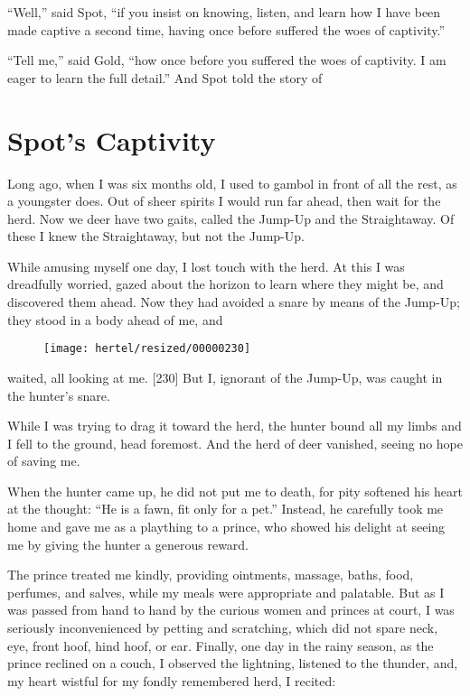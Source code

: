 \documentclass[article, twoside, 10pt]{memoir}
\begin{document}
``Well,'' said Spot,
``if you insist on knowing, listen, and learn how I have been made captive a second time, having once before suffered the woes of captivity.''

``Tell me,'' said Gold,
``how once before you suffered the woes of captivity. I am eager to learn the full detail.''
And Spot told the story of

\chapter{Spot's Captivity}

Long ago, when I was six months old, I used to gambol in front of
all the rest, as a youngster does. Out of sheer spirits I would run
far ahead, then wait for the herd. Now we deer have two gaits,
called the Jump-Up and the Straightaway. Of these I knew the
Straightaway, but not the Jump-Up.

While amusing myself one day, I lost touch with the herd. At this I
was dreadfully worried, gazed about the horizon to learn where they
might be, and discovered them ahead. Now they had avoided a snare
by means of the Jump-Up; they stood in a body ahead of me, and
\begin{figure}[p]\texttt{[image: hertel/resized/00000230]}\end{figure}waited, all looking at me. [230] But I, ignorant of the Jump-Up,
was caught in the hunter's snare.

While I was trying to drag it toward the herd, the hunter bound all
my limbs and I fell to the ground, head foremost. And the herd of
deer vanished, seeing no hope of saving me.

When the hunter came up, he did not put me to death, for pity
softened his heart at the thought:
``He is a fawn, fit only for a pet.'' Instead, he carefully took me
home and gave me as a plaything to a prince, who showed his delight
at seeing me by giving the hunter a generous reward.

The prince treated me kindly, providing ointments, massage, baths,
food, perfumes, and salves, while my meals were appropriate and
palatable. But as I was passed from hand to hand by the curious
women and princes at court, I was seriously inconvenienced by
petting and scratching, which did not spare neck, eye, front hoof,
hind hoof, or ear. Finally, one day in the rainy season, as the
prince reclined on a couch, I observed the lightning, listened to
the thunder, and, my heart wistful for my fondly remembered herd, I
recited:
\end{document}
